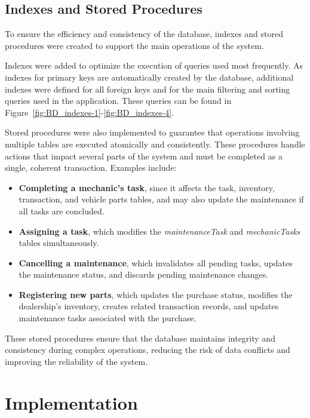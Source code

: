 \subsection{Indexes and Stored Procedures}

To ensure the efficiency and consistency of the database, indexes and stored procedures were created to support the main operations of the system.

Indexes were added to optimize the execution of queries used most frequently. As indexes for primary keys are automatically created by the database, additional indexes were defined for all foreign keys and for the main filtering and sorting queries used in the application. These queries can be found in Figure~\ref{fig:BD_indexes-1}-\ref{fig:BD_indexes-4}.  

Stored procedures were also implemented to guarantee that operations involving multiple tables are executed atomically and consistently. These procedures handle actions that impact several parts of the system and must be completed as a single, coherent transaction. Examples include:

\begin{itemize}
  \item \textbf{Completing a mechanic's task}, since it affects the task, inventory, transaction, and vehicle parts tables, and may also update the maintenance if all tasks are concluded.
  \item \textbf{Assigning a task}, which modifies the \textit{maintenanceTask} and \textit{mechanicTasks} tables simultaneously.
  \item \textbf{Cancelling a maintenance}, which invalidates all pending tasks, updates the maintenance status, and discards pending maintenance changes.
  \item \textbf{Registering new parts}, which updates the purchase status, modifies the dealership's inventory, creates related transaction records, and updates maintenance tasks associated with the purchase.
\end{itemize}

These stored procedures ensure that the database maintains integrity and consistency during complex operations, reducing the risk of data conflicts and improving the reliability of the system.




\section{Implementation}

